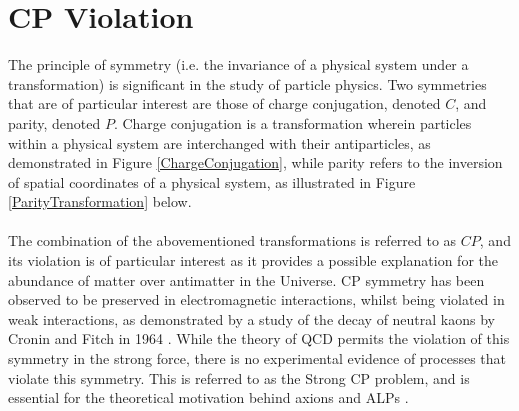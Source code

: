 \section{CP Violation}
The principle of symmetry (i.e. the invariance of a physical system under a transformation) is significant in the study of particle physics. Two symmetries that are of particular interest are those of charge conjugation, denoted $C$, and parity, denoted $P$. Charge conjugation is a transformation wherein particles within a physical system are interchanged with
their antiparticles, as demonstrated in Figure \ref{ChargeConjugation}, while parity refers to the inversion of spatial coordinates of a physical system, as illustrated in Figure \ref{ParityTransformation} below. 
\\
\\
The combination of the abovementioned transformations is referred to as $CP$, and its violation is of particular interest as it provides a possible explanation for the abundance of matter over antimatter in the Universe. CP symmetry has been observed to be preserved in electromagnetic interactions, whilst being violated in weak interactions, as demonstrated by 
a study of the decay of neutral kaons by Cronin and Fitch in 1964 \cite{PhysRevLett.13.138}. While the theory of QCD permits the violation of this symmetry in the strong force, there is no experimental evidence of processes that violate this symmetry. This is referred to as the Strong CP problem, and is essential for the theoretical motivation behind axions and ALPs \cite{PhysRevLett.40.223}.
